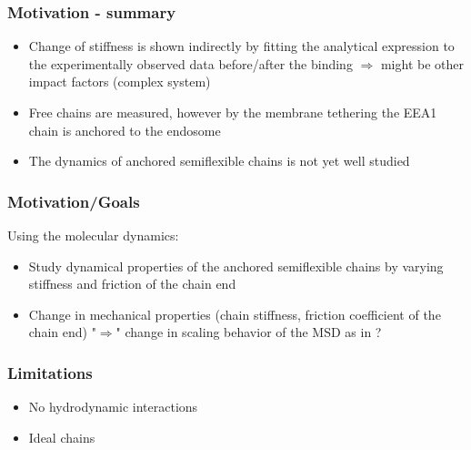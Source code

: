 \documentclass[handout]{beamer}
\begin{document}
\begin{frame}
\end{frame}


\begin{frame}
    \frametitle{Motivation - summary}
    \begin{itemize}
        \item Change of stiffness is shown indirectly by fitting the 
        analytical expression to the experimentally observed data before/after
        the binding $\Rightarrow$ might be other impact factors (complex system)
        \item Free chains are measured, however by the membrane tethering the EEA1 
        chain is anchored to the endosome
        \item The dynamics of anchored semiflexible chains is not yet well studied 
    \end{itemize} 
\end{frame}


\begin{frame}
    \frametitle{Motivation/Goals}

    Using the molecular dynamics:
    \vspace{0.5cm}
    \begin{itemize}
        \item Study dynamical properties of the anchored
        semiflexible chains by varying stiffness and friction of the chain end
        \item Change in mechanical properties (chain stiffness, friction coefficient of the chain end)
        "$\Rightarrow$" change in scaling behavior of the MSD as in \cite{Singh:2022}? 
    \end{itemize}

\end{frame}

\begin{frame}
    \frametitle{Limitations}

    \begin{itemize}
        \item No hydrodynamic interactions
        \item Ideal chains
    \end{itemize}

\end{frame}
\end{document}
